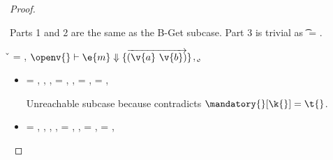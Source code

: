 \begin{lemma}
\begin{proof}
\begin{case}[B-Get]
\begin{itemize}
\begin{subcase}[T-GetHMapPartialDefault]
         Parts 1 and 2 are the same as the B-Get subcase.
         Part 3 is trivial as \t{} = \Top.
      \end{subcase}
  \end{itemize}
\end{case}

\begin{case}[B-GetMissing]
        \v{} = \nil,
        $\opsem {\openv{}}
        {\e{m}} {\curlymap{\overrightarrow{({\v{a}}\ {\v{b}})}}}$,
       \opsem {\openv{}} {} {\k{}},

  \begin{itemize}
    \item[]
      \begin{subcase}[T-GetHMap]
  \ep{} = { {}},
  \judgementrewrite {\propenv{}} {} {\Unionsplice {\overrightarrow {\HMapgeneric {\mandatory{}} {\absent{}}}}}
           { {}}
           {}
           {},
  \judgementtworewrite {\propenv{}} {} {}{},
  \e{} = { {}},
  ,
  \thenprop{\prop{}} = {\topprop{}},
  \elseprop{\prop{}} = {\topprop{}},

       Unreachable subcase because 
       contradicts ${\inmandatory{\k{}}{\t{}}{\mandatory{}}}$.
      \end{subcase}
    \item[]
      \begin{subcase}[T-GetHMapAbsent]
  \ep{} = { {}},
  \judgementtworewrite {\propenv{}} {} {} {},
  \judgementrewrite {\propenv{}} {} {\HMapgeneric {\mandatory{}} {\absent}}
           { {}}
           {}
           {},
  {\inabsent{\k{}}{\absent{}}},
  \e{} = { {}},
  \issubtypein{}{\Nil}{\t{}},
  \thenprop{\prop{}} = {\topprop{}},
  \elseprop{\prop{}} = {\topprop{}},


\end{subcase}
\end{itemize}
\end{case}
\end{proof}
\end{lemma}
